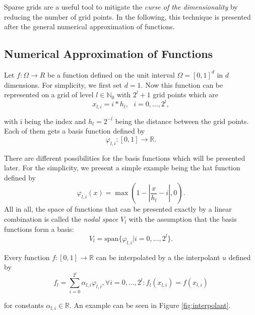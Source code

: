 Sparse grids are a useful tool to mitigate the \textit{curse of the dimensionality} by reducing the number of grid points. In the following, this technique is presented after the general numerical approximation of functions.

\subsection{Numerical Approximation of Functions}

\cite{b_splines}
Let $ f: \Omega \rightarrow R $ be a function defined on the unit interval $ \Omega = [0,1]^d $ in $ d $ dimensions. For simplicity, we first set $ d=1$. Now this function can be represented on a grid of level $ l \in \mathbb{N}_0 $ with $ 2^l + 1 $ grid points which are 
\begin{equation}
	x_{l,i} = i*h_l, \text{   } i = 0,...,2^l,
\end{equation}

with i being the index and $ h_l = 2^{-l} $ being the distance between the grid points. Each of them gets a basis function defined by 
\begin{equation}
	\varphi_{l,i}: [0,1] \rightarrow \mathbb{R}.
\end{equation}

There are different possibilities for the basis functions which will be presented later. For the simplicity, we present a simple example being the hat function defined by
\begin{equation}
	\varphi_{l,i}(x) = \max(1- |\frac{x}{h_l}-i|, 0).
\end{equation}
All in all, the space of functions that can be presented exactly by a linear combination is called the \textit{nodal space} $V_l$ with the assumption that the basis functions form a basis:
\begin{equation}
	V_l = \text{span}\{ \varphi_{l,i} | i = 0,...,2^l\}. 
\end{equation}

Every function $f: [0,1] \rightarrow \mathbb{R}$ can be interpolated by a the interpolant $ u $ defined by
\begin{equation}
	f_l = \sum_{i=0}^{2^l}\alpha_{l,i} \varphi_{l,i}, \forall i = 0,...,2^l: f_l(x_{l,i}) = f(x_{l,i})
\end{equation}

for constants $ \alpha_{l,i} \in \mathbb{R} $. An example can be seen in Figure \ref{fig:interpolant}.

